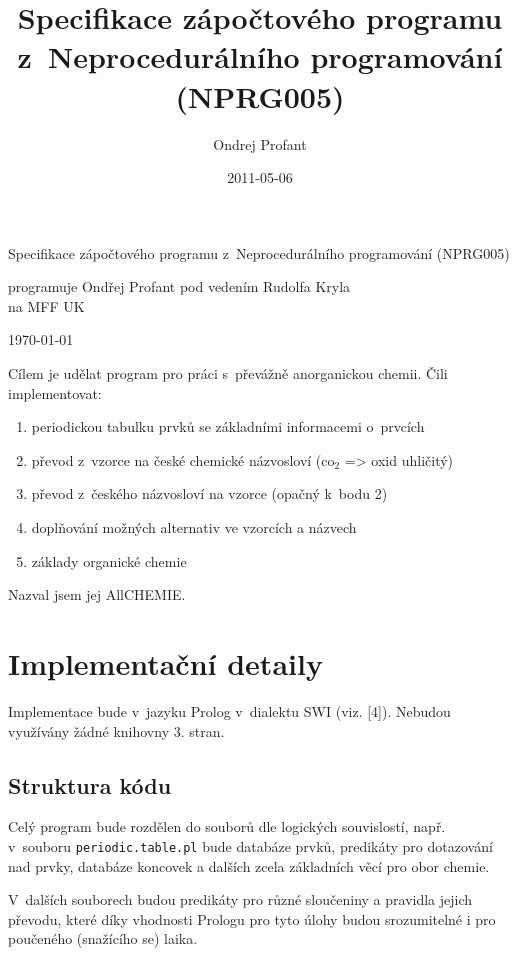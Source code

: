 \documentclass{article}
\title{Specifikace zápočtového programu z~Neprocedurálního
programování (NPRG005)}
\author{Ondrej Profant}
\date{2011-05-06}
\begin{document}
\begin{center}
\LARGE
Specifikace zápočtového programu z~Neprocedurálního
programování (NPRG005)

\vspace*{2cm}

\large
programuje Ondřej Profant pod vedením Rudolfa Kryla\\
na MFF UK

\vspace{2cm}

\today

\vspace{2cm}
\end{center}

\normalsize
Cílem je udělat program pro práci s~převážně anorganickou chemii. Čili
implementovat:

\begin{enumerate}
\item periodickou tabulku prvků se základními informacemi o~prvcích 
\item převod z~vzorce na české chemické názvosloví (co$_2$ ={\textgreater}
oxid uhličitý)
\item převod z~českého názvosloví na vzorce (opačný k~bodu 2)
\item doplňování možných alternativ ve vzorcích a názvech 
\item základy organické chemie
\end{enumerate}
Nazval jsem jej AllCHEMIE.

\clearpage

\tableofcontents

\clearpage
\section{Implementační detaily}
Implementace bude v~jazyku Prolog v~dialektu SWI (viz. [4]). Nebudou využívány žádné
knihovny 3. stran.

\subsection{Struktura kódu}
Celý program bude rozdělen do souborů dle logických souvislostí, např.
v~souboru \texttt{periodic.table.pl} bude databáze prvků, predikáty pro
dotazování nad prvky, databáze koncovek a dalších zcela základních věcí
pro obor chemie.

V~dalších souborech budou predikáty pro různé sloučeniny a pravidla
jejich převodu, které díky vhodnosti Prologu pro tyto úlohy budou
srozumitelné i pro poučeného (snažícího se) laika.
\end{document}
